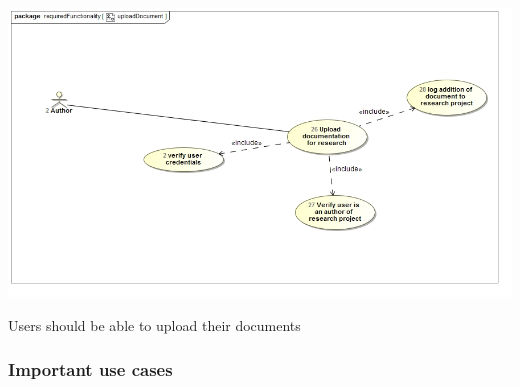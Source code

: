 \documentclass[a4paper,12pt]{report}
\begin{document}
\newpage

\begin{flushleft}
	\includegraphics[scale=0.5]{./images/uc__uploadDocument.jpg}
	\begin{center}
		Users should be able to upload their documents
	\end{center}
\end{flushleft}

\newpage
\subsubsection{Important use cases}
\end{document}
